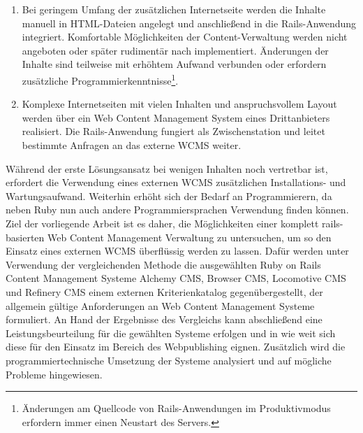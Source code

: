 \begin{enumerate}
\item{
Bei geringem Umfang der zusätzlichen Internetseite werden die Inhalte manuell in HTML-Dateien angelegt und anschließend in die Rails-Anwendung integriert. Komfortable Möglichkeiten der Content-Verwaltung werden nicht angeboten oder später rudimentär nach implementiert. Änderungen der Inhalte sind teilweise mit erhöhtem Aufwand verbunden oder erfordern zusätzliche Programmierkenntnisse\footnote{Änderungen am Quellcode von Rails-Anwendungen im Produktivmodus erfordern immer einen Neustart des Servers.}.
}

\item{
Komplexe Internetseiten mit vielen Inhalten und anspruchsvollem Layout werden über ein Web Content Management System eines Drittanbieters realisiert. Die Rails-Anwendung fungiert als Zwischenstation und leitet bestimmte Anfragen an das externe WCMS weiter.
}
\end{enumerate}

Während der erste Lösungsansatz bei wenigen Inhalten noch vertretbar ist, erfordert die Verwendung eines externen WCMS zusätzlichen Installations- und Wartungsaufwand. Weiterhin erhöht sich der Bedarf an Programmierern, da neben Ruby nun auch andere Programmiersprachen Verwendung finden können.
\newline
\newline
Ziel der vorliegende Arbeit ist es daher, die Möglichkeiten einer komplett rails-basierten Web Content Management Verwaltung zu untersuchen, um so den Einsatz eines externen WCMS überflüssig werden zu lassen.
\newline
\newline
Dafür werden unter Verwendung der vergleichenden Methode die ausgewählten Ruby on Rails Content Management Systeme Alchemy CMS, Browser CMS, Locomotive CMS und Refinery CMS einem externen Kriterienkatalog gegenübergestellt, der allgemein gültige Anforderungen an Web Content Management Systeme formuliert. An Hand der Ergebnisse des Vergleichs kann abschließend eine Leistungsbeurteilung für die gewählten Systeme erfolgen und in wie weit sich diese für den Einsatz im Bereich des Webpublishing eignen.
Zusätzlich wird die programmiertechnische Umsetzung der Systeme analysiert und auf mögliche Probleme hingewiesen.

